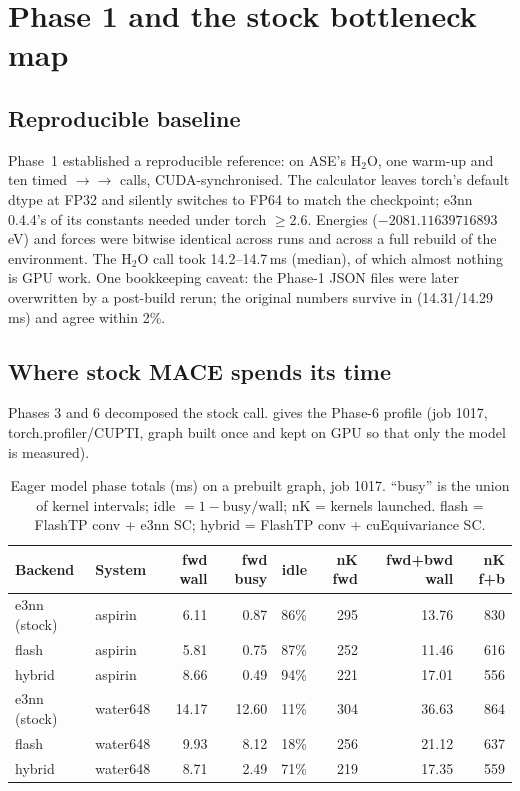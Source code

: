 \section{Phase 1 and the stock bottleneck map}
\label{sec:baseline}

\subsection{Reproducible baseline}
Phase~1 established a reproducible reference:  on ASE's H$_2$O, one warm-up and ten timed $\to$$\to$ calls, CUDA-synchronised. The calculator leaves torch's default dtype at FP32 and silently switches to FP64 to match the checkpoint; e3nn 0.4.4's  of its constants needed  under torch $\ge2.6$. Energies ($-2081.11639716893$\,eV) and forces were bitwise identical across runs and across a full rebuild of the environment. The H$_2$O call took 14.2--14.7\,ms (median), of which almost nothing is GPU work. One bookkeeping caveat: the Phase-1 JSON files were later overwritten by a post-build rerun; the original numbers survive in  (14.31/14.29\,ms) and agree within 2\%.

\subsection{Where stock MACE spends its time}
Phases 3 and 6 decomposed the stock call.  gives the Phase-6 profile (job 1017, torch.profiler/CUPTI, graph built once and kept on GPU so that only the model is measured).

\begin{table}[h]
\centering
\caption{Eager model phase totals (ms) on a prebuilt graph, job 1017. ``busy'' is the union of kernel intervals; idle $=1-\text{busy}/\text{wall}$; nK = kernels launched. flash = FlashTP conv + e3nn SC; hybrid = FlashTP conv + cuEquivariance SC.}
\label{tab:stockprof}
\small
\begin{tabular}{llrrrrrr}
\toprule
Backend & System & fwd wall & fwd busy & idle & nK fwd & fwd+bwd wall & nK f+b \\
\midrule
e3nn (stock) & aspirin & 6.11 & 0.87 & 86\% & 295 & 13.76 & 830 \\
flash & aspirin & 5.81 & 0.75 & 87\% & 252 & 11.46 & 616 \\
hybrid & aspirin & 8.66 & 0.49 & 94\% & 221 & 17.01 & 556 \\
e3nn (stock) & water648 & 14.17 & 12.60 & 11\% & 304 & 36.63 & 864 \\
flash & water648 & 9.93 & 8.12 & 18\% & 256 & 21.12 & 637 \\
hybrid & water648 & 8.71 & 2.49 & 71\% & 219 & 17.35 & 559 \\
\bottomrule
\end{tabular}
\end{table}

